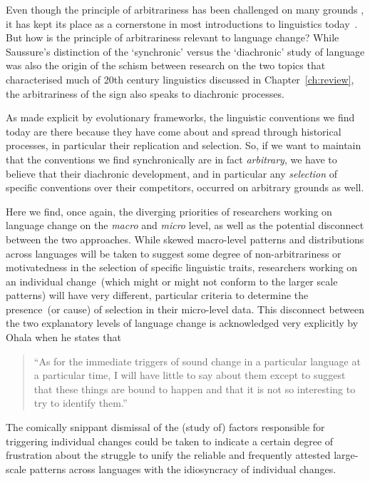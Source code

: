 Even though the principle of arbitrariness has been challenged on many grounds \citep[in particular by work on sound-symbolism, see e.g.][]{Nygaard2009}, it has kept its place as a cornerstone in most introductions to linguistics today~\citep[although see][for arguments to the contrary]{Joseph2000}.
But how is the principle of arbitrariness relevant to language change? While Saussure's distinction of the `synchronic' versus the `diachronic' study of language was also the origin of the schism between research on the two topics that characterised much of 20th century linguistics discussed in Chapter~\ref{ch:review}, the arbitrariness of the sign also speaks to diachronic processes.

As made explicit by evolutionary frameworks, the linguistic conventions we find today are there because they have come about and spread through historical processes, in particular their replication and selection. So, if we want to maintain that the conventions we find synchronically are in fact \emph{arbitrary}, we have to believe that their diachronic development, and in particular any \emph{selection} of specific conventions over their competitors, occurred on arbitrary grounds as well.

Here we find, once again, the diverging priorities of researchers working on language change on the \emph{macro} and \emph{micro} level, as well as the potential disconnect between the two approaches. While skewed macro-level patterns and distributions across languages will be taken to suggest some degree of non-arbitrariness or motivatedness in the selection of specific linguistic traits, researchers working on an individual change~(which might or might not conform to the larger scale patterns) will have very different, particular criteria to determine the presence~(or cause) of selection in their micro-level data. This disconnect between the two explanatory levels of language change is acknowledged very explicitly by Ohala when he states that

\begin{quote}
``As for the immediate triggers of sound change in a particular language at a particular time, I will have little to say about them except to suggest that these things are bound to happen and that it is not so interesting to try to identify them.''~\citep[p.174]{Ohala1989} %
\end{quote}
The comically snippant dismissal of the (study of) factors responsible for triggering individual changes could be taken to indicate a certain degree of frustration about the struggle to unify the reliable and frequently attested large-scale patterns across languages with the idiosyncracy of individual changes.

